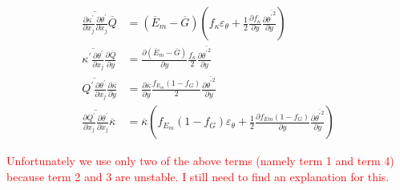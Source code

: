 \documentclass[10pt]{article}
\def\lp{\left(}
\def\rp{\right)}
\def\tp{\overline{{\theta^\prime}^2}}
\def\tr{{\theta^\prime}}
\def\et{{\varepsilon_{\theta}}}
\begin{document}
\begin{equation*} 
\begin{split}
\overline{\frac{\partial \kappa^\prime}{\partial x_j}\frac{\partial \tr}{\partial x_j}}\overline{Q} & = (\overline{E}_m-\overline{G}) \lp f_{\kappa} \et + \frac{1}{2}\frac{\partial f_{\kappa}}{\partial y}\frac{\partial \tp}{\partial y} \rp \\
\overline{\kappa^\prime\frac{\partial \tr}{\partial x_j}} \frac{\partial \overline{Q}}{\partial y} & = \frac{\partial (\overline{E}_m - \overline{G})}{\partial y} \frac{f_{\kappa}}{2} \frac{\partial \tp}{\partial y} \\
\overline{ Q^\prime\frac{\partial \tr}{\partial x_j}}\frac{\partial \overline{\kappa}}{\partial y} & = \frac{\partial \overline{\kappa}}{\partial y} \frac{f_{E_m}(1-f_G)}{2}\frac{\partial \tp}{\partial y}\\
\overline{\frac{\partial Q^\prime}{\partial x_j}\frac{\partial \tr}{\partial x_j}}\overline{\kappa} & = \overline{\kappa} \lp f_{E_m}(1-f_G) \et + \frac{1}{2}\frac{\partial f_{Em}(1-f_G)}{\partial y} \frac{\partial \tp}{\partial y} \rp
\end{split}
\end{equation*}

\noindent \textcolor{red}{Unfortunately we use only two of the above terms (namely term 1 and term 4) because term 2 and 3 are unstable. I still need to find an explanation for this.}
\end{document}
